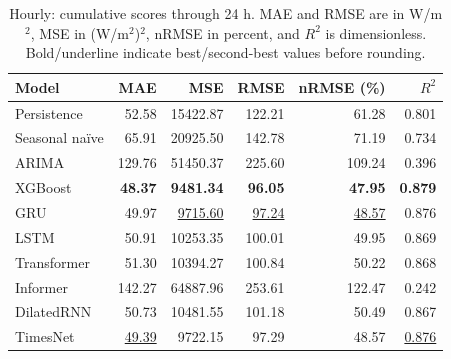 \begin{table}[!htbp]
\centering
\small
\setlength{\tabcolsep}{6pt}
\caption{Hourly: cumulative scores through 24 h. MAE and RMSE are in W/m$^2$, MSE in (W/m$^2$)$^2$, nRMSE in percent, and $R^2$ is dimensionless. Bold/underline indicate best/second-best values before rounding.}
\label{tab:baseline_hourly_72_extension_24}
\begin{tabular}{@{}lrrrrr@{}}
\toprule
Model & MAE & MSE & RMSE & nRMSE (\%) & $R^2$ \\
\midrule
Persistence & 52.58 & 15422.87 & 122.21 & 61.28 & 0.801 \\
Seasonal na\"ive & 65.91 & 20925.50 & 142.78 & 71.19 & 0.734 \\
ARIMA & 129.76 & 51450.37 & 225.60 & 109.24 & 0.396 \\
XGBoost & \textbf{48.37} & \textbf{9481.34} & \textbf{96.05} & \textbf{47.95} & \textbf{0.879} \\
GRU & 49.97 & \underline{9715.60} & \underline{97.24} & \underline{48.57} & 0.876 \\
LSTM & 50.91 & 10253.35 & 100.01 & 49.95 & 0.869 \\
Transformer & 51.30 & 10394.27 & 100.84 & 50.22 & 0.868 \\
Informer & 142.27 & 64887.96 & 253.61 & 122.47 & 0.242 \\
DilatedRNN & 50.73 & 10481.55 & 101.18 & 50.49 & 0.867 \\
TimesNet & \underline{49.39} & 9722.15 & 97.29 & 48.57 & \underline{0.876} \\
\bottomrule
\end{tabular}
\end{table}

